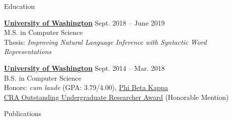 \documentclass{resume}
\begin{document}
\begin{rSection}{Education}

  {\href{https://www.cs.washington.edu/}
    {\bf University of Washington}} \hfill {Sept. 2018 -- June 2019} \\
  M.S. in Computer Science \\
  Thesis: \emph{Improving Natural Language Inference with Syntactic Word Representations}

  \vspace{-0.2em}
  {\href{https://www.cs.washington.edu/}
        {\bf University of Washington}} \hfill {Sept. 2014 -- Mar. 2018} \\
  B.S. in Computer Science \\
  Honors: \emph{cum laude} (GPA: 3.79/4.00), \href{https://www.pbk.org/web}
    {Phi Beta Kappa} \\
  \href{https://cra.org/about/awards/outstanding-undergraduate-researcher-award/}
       {CRA Outstanding Undergraduate Researcher Award} (Honorable Mention)

\end{rSection}

\begin{rSection}{Publications}
\vspace{1.5em}


\end{rSection}
\end{document}
